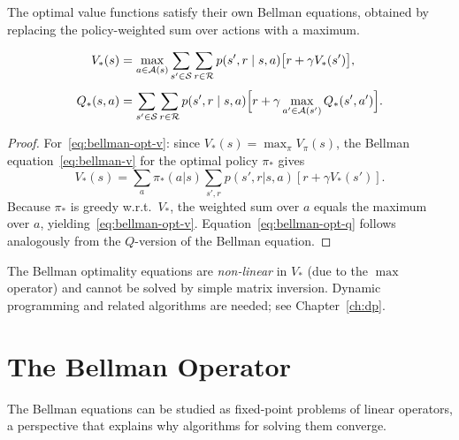 The optimal value functions satisfy their own Bellman equations, obtained by replacing the policy-weighted sum over actions with a maximum.

\begin{theorem}
\label{thm:bellman-optimality}
\begin{align}
V_*(s) &= \max_{a \in \mathcal{A}(s)}
           \sum_{s' \in \mathcal{S}} \sum_{r \in \mathcal{R}}
           p(s', r \mid s, a)\bigl[r + \gamma V_*(s')\bigr],
           \label{eq:bellman-opt-v} \\[4pt]
Q_*(s, a) &= \sum_{s' \in \mathcal{S}} \sum_{r \in \mathcal{R}}
             p(s', r \mid s, a)
             \Bigl[r + \gamma \max_{a' \in \mathcal{A}(s')} Q_*(s', a')\Bigr].
             \label{eq:bellman-opt-q}
\end{align}
\end{theorem}

\begin{proof}
For~\eqref{eq:bellman-opt-v}: since $V_*(s) = \max_\pi V_\pi(s)$, the Bellman equation~\eqref{eq:bellman-v} for the optimal policy $\pi_*$ gives
\[
V_*(s) = \sum_a \pi_*(a|s) \sum_{s',r} p(s',r|s,a)[r + \gamma V_*(s')].
\]
Because $\pi_*$ is greedy w.r.t.\ $V_*$, the weighted sum over $a$ equals the maximum over $a$, yielding~\eqref{eq:bellman-opt-v}. Equation~\eqref{eq:bellman-opt-q} follows analogously from the $Q$-version of the Bellman equation.
\end{proof}

\begin{remark}
The Bellman optimality equations are \emph{non-linear} in $V_*$ (due to the $\max$ operator) and cannot be solved by simple matrix inversion. Dynamic programming and related algorithms are needed; see Chapter~\ref{ch:dp}.
\end{remark}


\section{The Bellman Operator}
\label{sec:bellman-operator}

The Bellman equations can be studied as fixed-point problems of linear operators, a perspective that explains why algorithms for solving them converge.

